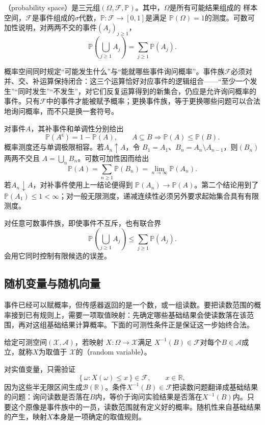\begin{definition}[概率空间]
  \label{def:probability-space}
（probability space）是三元组\((\Omega,\mathcal{F},\mathbb{P})\)。其中，\(\Omega\)是所有可能结果组成的
样本空间，\(\mathcal{F}\)是事件组成的\(\sigma\)代数，\(\mathbb{P}:\mathcal{F}\to[0,1]\)是满足
\(\mathbb{P}(\Omega)=1\)的测度。可数可加性说明，对两两不交的事件\((A_j)_{j\geq1}\)，
\[ \mathbb{P}\left(\bigcup_{j\geq1}A_j\right)
  =\sum_{j\geq1}\mathbb{P}(A_j). \]
\end{definition}
概率空间同时规定“可能发生什么”与“能就哪些事件询问概率”。事件族\(\mathcal F\)必须对并、交、补运算保持闭合：这三个运算恰好对应事件的逻辑组合——“至少一个发生”“同时发生”“不发生”，对它们反复运算得到的新集合，仍应是允许询问概率的事件。只有\(\mathcal F\)中的事件才能被赋予概率；更换事件族，等于更换哪些问题可以合法地询问概率，而不只是换一套符号。

对事件\(A\)，其补事件和单调性分别给出
\[ \mathbb{P}(A^{\mathsf c})=1-\mathbb{P}(A),
  \qquad A\subseteq B\Longrightarrow\mathbb{P}(A)\leq\mathbb{P}(B). \]
概率测度还与单调极限相容。若\(A_n\uparrow A\)，令
\(B_1=A_1\)、\(B_n=A_n\setminus A_{n-1}\)，则\((B_n)\)两两不交且
\(A=\bigcup_nB_n\)。可数可加性因而给出
\[
  \mathbb{P}(A)
  =\sum_{n\geq1}\mathbb{P}(B_n)
  =\lim_{n\to\infty}\mathbb{P}(A_n).
\]
若\(A_n\downarrow A\)，对补事件使用上一结论便得到
\(\mathbb{P}(A_n)\to\mathbb{P}(A)\)。第二个结论用到了
\(\mathbb{P}(A_1)\leq1<\infty\)；对一般无限测度，递减连续性必须另外要求起始集合具有有限测度。

对任意可数事件族，即使事件不互斥，也有联合界
\begin{equation}
  \mathbb{P}\left(\bigcup_{j\geq1}A_j\right)
  \leq
  \sum_{j\geq1}\mathbb{P}(A_j).
  \label{eq:probability-union-bound}
\end{equation}
会用它同时控制有限候选的误差。
\subsection{随机变量与随机向量}
事件已经可以赋概率，但传感器返回的是一个数，或一组读数。要把读数范围的概率接到已有规则上，需要一项取值映射：先确定哪些基础结果会使读数落在该范围，再对这组基础结果计算概率。下面的可测性条件正是保证这一步始终合法。
\begin{definition}[随机变量]
  \label{def:probability-random-variable}
给定可测空间\((\mathcal{X},\mathcal{A})\)，若映射
\(X:\Omega\to\mathcal{X}\)满足
\(X^{-1}(B)\in\mathcal{F}\)对每个\(B\in\mathcal{A}\)成立，就称\(X\)为取值于
\(\mathcal{X}\)的（random variable）。
\end{definition}
对实值变量，只需验证
\[ \{\,\omega:X(\omega)\leq x\,\}\in\mathcal{F},
  \qquad x\in\mathbb{R}, \]
因为这些半无限区间生成\(\mathcal{B}(\mathbb{R})\)。条件\(X^{-1}(B)\in\mathcal F\)把读数问题翻译成基础结果的问题：询问读数是否落在\(B\)内，等价于询问实验结果是否落在\(X^{-1}(B)\)内。只要这个原像是事件族中的一员，读数范围就有定义好的概率。随机性来自基础结果的产生，映射\(X\)本身是一项确定的取值规则。

